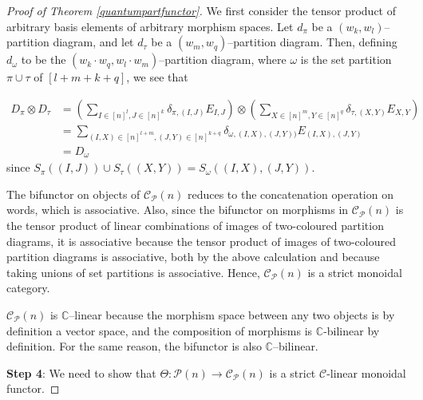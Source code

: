 \documentclass{article}
\theoremstyle{plain}
\theoremstyle{definition}
\theoremstyle{remark}
\begin{document}
\begin{proof}[Proof of Theorem \ref{quantumpartfunctor}]
	We first consider the tensor product of arbitrary basis elements 
	of arbitrary morphism spaces.
	Let $d_\pi$ be a $(w_k,w_l)$--partition diagram,
	and let $d_\tau$ be a $(w_m,w_q)$--partition diagram.
	Then, defining $d_{\omega}$ to be the $(w_k \cdot w_q, w_l \cdot w_m)$--partition
	diagram, where $\omega$ is the set partition $\pi \cup \tau$ of $[l+m+k+q]$,
	we see that
	
	\begin{align} \label{imagestensorprod}
	D_\pi \otimes D_\tau 
		& =
		\left(
		\sum_{I \in [n]^l, J \in [n]^k}
		\delta_{\pi, (I,J)}
		E_{I,J}
		\right)
		\otimes
		\left(
		\sum_{X \in [n]^m, Y \in [n]^q}
		\delta_{\tau, (X,Y)}
		E_{X,Y} 
		\right)
		\\
		& =
		\sum_{(I,X) \in [n]^{l+m}, (J,Y) \in [n]^{k+q}}
		\delta_{\omega, (I,X),(J,Y))}
		E_{(I,X),(J,Y)} \label{deltaprod} \\
		& = D_\omega
	\end{align}
	since $S_\pi((I,J)) \cup S_\tau((X,Y)) = S_\omega((I,X),(J,Y))$.

	The bifunctor on objects of $\mathcal{C}_{\mathcal{P}}(n)$ 
	reduces to the concatenation
	operation on words, which is associative. 
	Also, since the bifunctor on
	morphisms in $\mathcal{C}_{\mathcal{P}}(n)$ 
	is the tensor product of linear combinations of images
	of two-coloured partition diagrams, it is associative because
	the tensor product of images of two-coloured partition diagrams is associative,
	both by the above calculation and because taking unions of set partitions 
	is associative.
	Hence, $\mathcal{C}_{\mathcal{P}}(n)$ is a strict monoidal category.

	$\mathcal{C}_{\mathcal{P}}(n)$ is $\mathbb{C}$--linear because 
	the morphism space between any two objects is by definition a vector space,
	and the composition of morphisms is $\mathbb{C}$-bilinear 
	by definition.
	For the same reason, the bifunctor is also $\mathbb{C}$--bilinear.

	\textbf{Step 4}: We need to show that $\Theta : \mathcal{P}(n) \rightarrow \mathcal{C}_{\mathcal{P}}(n)$ is a strict $\mathcal{C}$-linear monoidal functor.


\end{proof}
\end{document}
